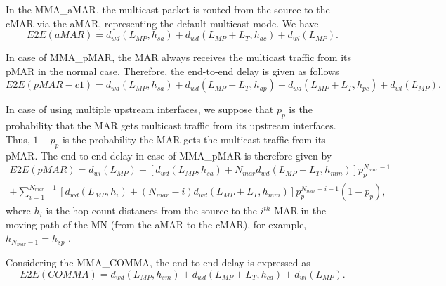 In the MMA\_aMAR, the multicast packet is routed from the source to the cMAR via the aMAR, representing the default multicast mode. We have \\
\begin{equation}
E2E(aMAR) = d_{wd}(L_{MP},h_{sa}) + d_{wd}(L_{MP}+L_{T},h_{ac}) + d_{wl}(L_{MP}).
\end{equation}

In case of MMA\_pMAR, the MAR always receives the multicast traffic from its pMAR in the normal case. Therefore, the end-to-end delay is given as follows \\
\begin{equation}
E2E(pMAR-c1)= d_{wd}(L_{MP},h_{sa}) + d_{wd}(L_{MP} +L_{T},h_{ap}) + d_{wd}(L_{MP} + L_{T},h_{pc})  + d_{wl}(L_{MP}).
\end{equation}

In case of using multiple upstream interfaces, we suppose that $p_{p}$ is the probability that the MAR gets multicast traffic from its upstream interfaces. Thus, $1-p_{p}$ is the probability the MAR gets the multicast traffic from its pMAR. The end-to-end delay in case of MMA\_pMAR is therefore given by
\begin{multline}
E2E(pMAR)=   d_{wl}(L_{MP}) + [d_{wd}(L_{MP},h_{sa})+ N_{mar} d_{wd}(L_{MP} +L_{T},h_{mm})] p_{p}^{N_{mar}-1} \\+ \sum_{i=1}^{N_{mar}-1} [d_{wd}(L_{MP},h_{i})+ (N_{mar}-i) d_{wd}(L_{MP} +L_{T},h_{mm})] p_{p}^{N_{mar}-i-1} (1-p_{p}),
\end{multline}
where $h_{i}$ is the hop-count distances from the source to the $i^{th}$ MAR in the moving path of the MN (from the aMAR to the cMAR), for example, $ h_{N_{mar}-1} = h_{sp}$ .  

Considering the MMA\_COMMA, the end-to-end delay is expressed as\\
\begin{equation}
E2E(COMMA) = d_{wd}(L_{MP},h_{sm})  + d_{wd}(L_{MP}+L_{T},h_{cd}) + d_{wl}(L_{MP}).
\end{equation}

